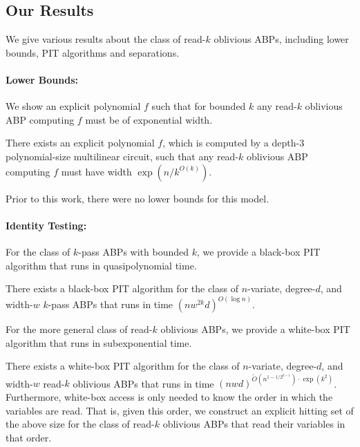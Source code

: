 \documentclass[11pt]{article}
\begin{document}
\subsection{Our Results}
\label{sec:results}

We give various results about the class of read-$k$ oblivious ABPs, including lower bounds, PIT algorithms and separations.

\paragraph{Lower Bounds:} We show an explicit polynomial $f$ such that for bounded $k$ any read-$k$ oblivious ABP computing $f$ must be of exponential width.

\begin{theorem}
\label{thm:intro:lower-bound-k-abp}
There exists an explicit polynomial $f$, which is computed by a depth-3 polynomial-size multilinear circuit, such that any read-$k$ oblivious ABP computing $f$ must have width $\exp(n/k^{O(k)})$.
\end{theorem}

Prior to this work, there were no lower bounds for this model.

\paragraph{Identity Testing:} For the class of $k$-pass ABPs with bounded $k$, we provide a black-box PIT algorithm that runs in quasipolynomial time.

\begin{theorem}
\label{thm:intro:pit-k-pass}
There exists a black-box PIT algorithm for the class of $n$-variate, degree-$d$, and width-$w$ $k$-pass ABPs that runs in time $(nw^{2k}d)^{O(\log n)}$.
\end{theorem}

For the more general class of read-$k$ oblivious ABPs, we provide a white-box PIT algorithm that runs in subexponential time.

\begin{theorem}
\label{thm:intro:pit-k-abp}
There exists a white-box PIT algorithm for the class of $n$-variate, degree-$d$, and width-$w$ read-$k$ oblivious ABPs that runs in time $(nwd)^{\tilde{O}(n^{1-1/2^{k-1}})\cdot\exp(k^2)}$.
Furthermore, white-box access is only needed to know the order in which the variables are read.
That is, given this order, we construct an explicit hitting set of the above size for the class of read-$k$ oblivious ABPs that read their variables in that order.
\end{theorem}
\end{document}
